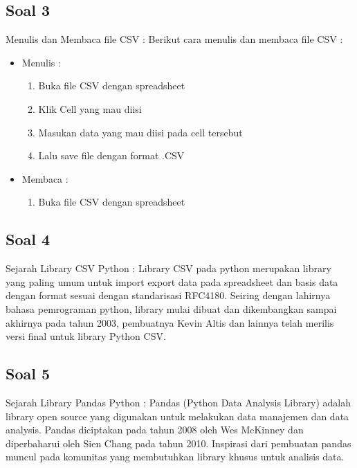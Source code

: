 \subsection{Soal 3}
Menulis dan Membaca file CSV : 
Berikut cara menulis dan membaca file CSV : 
\begin{itemize}
	\item Menulis : \begin{enumerate}
						\item Buka file CSV dengan spreadsheet
						\item Klik Cell yang mau diisi
						\item Masukan data yang mau diisi pada cell tersebut
						\item Lalu save file dengan format .CSV
					\end{enumerate}
	\item Membaca : \begin{enumerate}
						\item Buka file CSV dengan spreadsheet						
					\end{enumerate}
\end{itemize}
\subsection{Soal 4}
Sejarah Library CSV Python : 
Library CSV pada python merupakan library yang paling umum untuk import export data pada spreadsheet dan basis data dengan format sesuai dengan standarisasi RFC4180. Seiring dengan lahirnya bahasa pemrograman python, library mulai dibuat dan dikembangkan sampai akhirnya pada tahun 2003, pembuatnya Kevin Altis dan lainnya telah merilis versi final untuk library Python CSV. 
\subsection{Soal 5}
Sejarah Library Pandas Python : 
Pandas (Python Data Analysis Library) adalah library open source yang digunakan untuk melakukan data manajemen dan data analysis. Pandas diciptakan pada tahun 2008 oleh Wes McKinney dan diperbaharui oleh Sien Chang pada tahun 2010. Inspirasi dari pembuatan pandas muncul pada komunitas yang membutuhkan library khusus untuk analisis data. 
